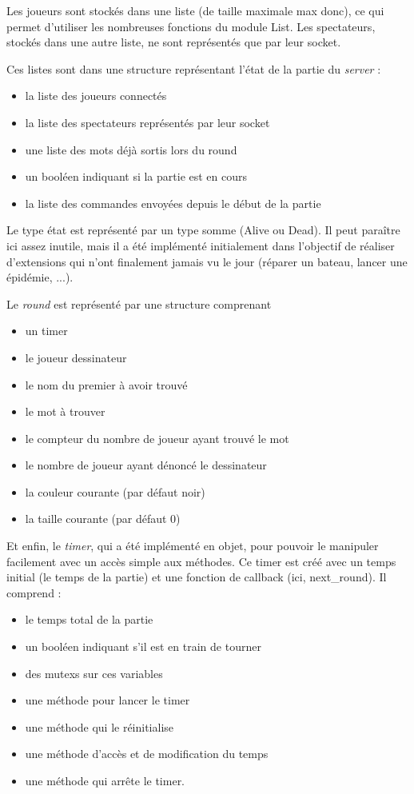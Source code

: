 \documentclass[a4paper, 11pt]{report}
\begin{document}
Les joueurs sont stockés dans une liste (de taille maximale max donc),
ce qui permet d'utiliser les nombreuses fonctions du module List. 
Les spectateurs, stockés dans une autre liste, ne sont représentés que par leur socket.

Ces listes sont dans une structure représentant l'état de la
partie du \emph{server} :
\begin{itemize}
\item la liste des joueurs connectés
\item la liste des spectateurs représentés par leur socket
\item une liste des mots déjà sortis lors du round
\item un booléen indiquant si la partie est en cours
\item la liste des commandes envoyées depuis le début de la partie
\end{itemize}

Le type état est représenté par un type somme (Alive ou Dead). Il peut paraître ici assez inutile, mais il a été implémenté initialement dans l'objectif de réaliser d'extensions qui n'ont finalement jamais vu le jour (réparer un bateau, lancer une épidémie, ...).

Le \emph{round} est représenté par une structure comprenant 
\begin{itemize}
\item un timer
\item le joueur dessinateur
\item le nom du premier à avoir trouvé
\item le mot à trouver
\item le compteur du nombre de joueur ayant trouvé le mot
\item le nombre de joueur ayant dénoncé le dessinateur
\item la couleur courante (par défaut noir)
\item la taille courante (par défaut 0)
\end{itemize}

Et enfin, le \emph{timer}, qui a été implémenté en objet, pour pouvoir le 
manipuler facilement avec un accès simple aux méthodes.
Ce timer est créé avec un temps initial (le temps de la partie) et une
fonction de callback (ici, next\_round). Il comprend :
\begin{itemize}
\item le temps total de la partie
\item un booléen indiquant s'il est en train de tourner
\item des mutexs sur ces variables
\item une méthode pour lancer le timer
\item une méthode qui le réinitialise
\item une méthode d'accès et de modification du temps
\item une méthode qui arrête le timer.
\end{itemize}
\end{document}
